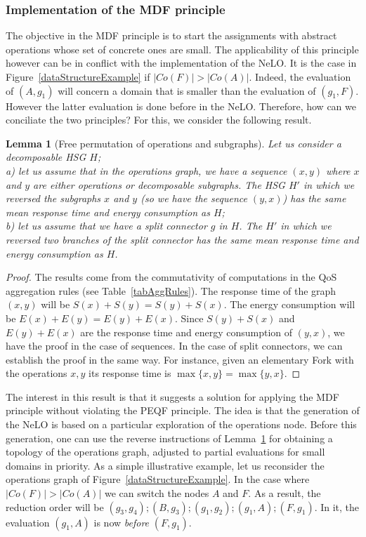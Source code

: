 \documentclass[a4paper]{article}
\newtheorem{lemma}{Lemma}
\begin{document}
\subsubsection{Implementation of the MDF principle}

The objective in the MDF principle is to start the assignments with abstract operations whose set of 
concrete ones are small. The applicability of this principle however can be in conflict with the implementation 
of the NeLO. It is the case in Figure~\ref{dataStructureExample} 
if $|Co(F)| > |Co(A)|$. Indeed, the evaluation of $(A, g_1)$ will concern a domain that is smaller than the 
evaluation of $(g_1, F)$. However the latter evaluation is done before in the NeLO. Therefore, how can we 
conciliate the two principles? For this, we consider the following result. 

\begin{lemma}[Free permutation of operations and subgraphs]\label{freePermutation}
Let us consider a decomposable HSG $H$; \\ a) let us assume that in  the operations graph, we have a sequence $(x, y)$  where $x$ and $y$ are either 
operations or decomposable subgraphs. The HSG $H'$ in which we reversed the subgraphs $x$ and 
$y$ (so we have the sequence $(y, x)$) has the same mean response time and energy consumption as $H$; \\ b) let us assume that 
we have a split connector $g$ in $H$. The $H'$ in which we reversed two branches of the split connector 
has the same mean response time and energy consumption as $H$. 
\end{lemma}

\begin{proof}
The results come from the commutativity of computations in the QoS aggregation rules (see Table~\ref{tabAggRules}). 
The response time of the graph $(x, y)$ will be $S(x)+S(y) = S(y) + S(x)$. The energy consumption will be 
$E(x)+E(y) = E(y) + E(x)$. Since $S(y) + S(x)$ and $E(y) + E(x)$ are the response time and energy consumption of 
$(y,x)$, we have the proof in the case of sequences. In the case of split connectors, we can establish the 
proof in the same way. For instance, given an elementary Fork with the operations $x, y$ its response time 
is $\max\{x, y\} = \max\{y, x\}$.
\end{proof}

The interest in this result is that it suggests a solution for applying the MDF principle 
without violating the PEQF principle. The idea is that the generation of the NeLO is based on a particular 
exploration of the operations node. Before this generation, one can use the reverse instructions of Lemma~\ref{freePermutation} 
for obtaining a topology of the operations graph, adjusted to  partial evaluations for  
small domains in priority.  
As a simple illustrative example, let us reconsider the operations graph of Figure~\ref{dataStructureExample}. 
In the case where $|Co(F)| > |Co(A)|$ we can switch the nodes $A$ and 
$F$. As a result, the reduction order will be $(g_3,g_4); (B, g_3); (g_1,g_2); (g_1, A); (F,g_1)$. In it, 
the evaluation $(g_1, A)$ is now {\it before} $(F,g_1)$.
\end{document}
